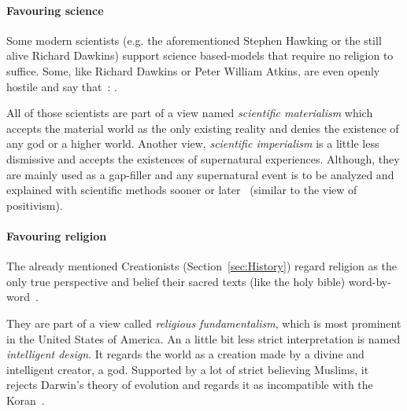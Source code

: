 
\paragraph{Favouring science}
Some modern scientists (e.g. the aforementioned Stephen Hawking or the still alive Richard Dawkins) support science based-models that require no religion to suffice.
Some, like Richard Dawkins or Peter William Atkins, are even openly hostile and say that~\cite{dawkins2006god}: .

All of those scientists are part of a view named \emph{scientific materialism} which accepts the material world as the only existing reality and denies the existence of any god or a higher world.
Another view, \emph{scientific imperialism} is a little less dismissive and accepts the existences of supernatural experiences.
Although, they are mainly used as a gap-filler and any supernatural event is to be analyzed and explained with scientific methods sooner or later~\cite{krishna1971gopi} (similar to the view of positivism). %


\paragraph{Favouring religion}
The already mentioned Creationists (Section~\ref{sec:History}) regard religion as the only true perspective and belief their sacred texts (like the holy bible) word-by-word~\cite{Hameed1637}.

They are part of a view called \emph{religious fundamentalism}, which is most prominent in the United States of America.
An a little bit less strict interpretation is named \emph{intelligent design}. It regards the world as a creation made by a divine and intelligent creator, a god.
Supported by a lot of strict believing Muslims, it rejects Darwin's theory of evolution and regards it as incompatible with the Koran~\cite{Demirci2016}.


